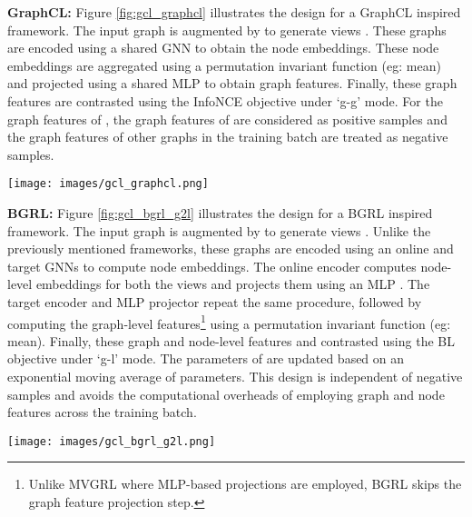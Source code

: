 \documentclass{article}
\theoremstyle{plain}
\theoremstyle{definition}
\theoremstyle{remark}
\begin{document}
\textbf{GraphCL:} Figure \ref{fig:gcl_graphcl} illustrates the design for a GraphCL \citep{you2020graph} inspired framework. The input graph  is augmented by  to generate views . These graphs are encoded using a shared GNN  to obtain the node embeddings. These node embeddings are aggregated using a permutation invariant function  (eg: mean) and projected using a shared MLP  to obtain graph features. Finally, these graph features are contrasted using the InfoNCE objective under `g-g' mode. For the graph features of , the graph features of  are considered as positive samples and the graph features of other graphs in the training batch are treated as negative samples.
 
\begin{figure*}[ht]
\vskip 0.2in
\begin{center}
\centerline{\texttt{[image: images/gcl\_graphcl.png]}}
\caption{GraphCL design with shared encoder , shared graph feature projector , g-g contrastive mode and InfoNCE objective.} 
\label{fig:gcl_graphcl}
\end{center}
\vskip -0.2in
\end{figure*}

\textbf{BGRL:} Figure \ref{fig:gcl_bgrl_g2l} illustrates the design for a BGRL \citep{thakoor2021bootstrapped} inspired framework. The input graph  is augmented by  to generate views . Unlike the previously mentioned frameworks, these graphs are encoded using an online and target GNNs  to compute node embeddings. The online encoder  computes node-level embeddings for both the views and projects them using an MLP . The target encoder  and MLP projector  repeat the same procedure, followed by computing the graph-level features\footnote{Unlike MVGRL where MLP-based projections  are employed, BGRL skips the graph feature projection step.} using a permutation invariant function  (eg: mean). Finally, these graph and node-level features and contrasted using the BL objective under `g-l' mode. The parameters of  are updated based on an exponential moving average of  parameters. This design is independent of negative samples and avoids the computational overheads of employing graph and node features across the training batch.

\begin{figure*}[ht]
\vskip 0.2in
\begin{center}
\centerline{\texttt{[image: images/gcl\_bgrl\_g2l.png]}}
\caption{BGRL design with online, target encoders , their node projectors , g-l contrastive mode and BL objective.} 
\label{fig:gcl_bgrl_g2l}
\end{center}
\vskip -0.2in
\end{figure*}
\end{document}
